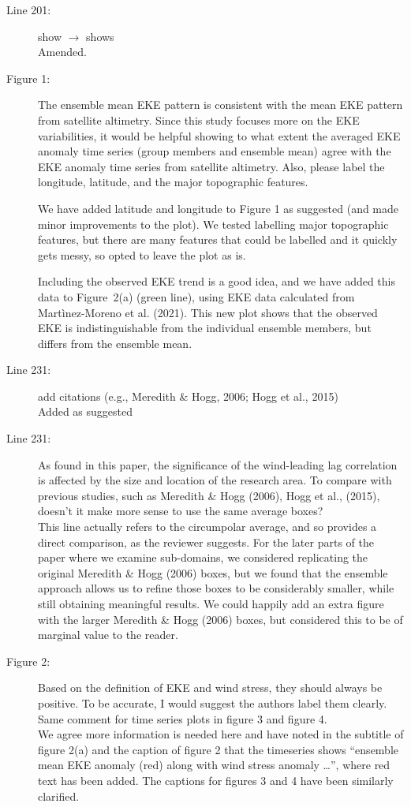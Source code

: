 \documentclass[11pt]{article}
\begin{document}
{\begin{description}
\item[Line 201:] show $\to$ shows\\
{\color{black} Amended. }

\item[Figure 1:] The ensemble mean EKE pattern is consistent with the mean EKE pattern from satellite altimetry. Since this study focuses more on the EKE variabilities, it would be helpful showing to what extent the averaged EKE anomaly time series (group members and ensemble mean) agree with the EKE anomaly time series from satellite altimetry. Also, please label the longitude, latitude, and the major topographic features. \\
{\color{black}  We have added latitude and longitude to Figure 1 as suggested (and made minor improvements to the plot).
We tested labelling major topographic features, but there are many features that could be labelled and it quickly gets messy, so opted to leave the plot as is.

Including the observed EKE trend is a good idea, and we have added this data to Figure~2(a) (green line), using EKE data calculated from Mart\`inez-Moreno et al. (2021).
This new plot shows that the observed EKE is indistinguishable from the individual ensemble members, but differs from the ensemble mean.}

\item[Line 231:] add citations (e.g., Meredith \& Hogg, 2006; Hogg et al., 2015) \\
{\color{black} Added as suggested }

\item[Line 231:] As found in this paper, the significance of the wind-leading lag correlation is affected by the size and location of the research area. To compare with previous studies, such as Meredith \& Hogg (2006), Hogg et al., (2015), doesn't it make more sense to use the same average boxes? \\
{\color{black} This line actually refers to the circumpolar average, and so provides a direct comparison, as the reviewer suggests.  
For the later parts of the paper where we examine sub-domains, we considered replicating the original Meredith \& Hogg (2006) boxes, but we found that the ensemble approach allows us to refine those boxes to be considerably smaller, while still obtaining meaningful results.
We could happily add an extra figure with the larger Meredith \& Hogg (2006) boxes, but considered this to be of marginal value to the reader.}

\item[Figure 2:] Based on the definition of EKE and wind stress, they should always be positive. To be accurate, I would suggest the authors label them clearly. Same comment for time series plots in figure 3 and figure 4. \\
{\color{black} We agree more information is needed here and have noted in the subtitle of figure 2(a) and the caption of figure 2 that the timeseries shows ``ensemble mean {\color{red}EKE anomaly} (red) along with wind stress {\color{red}anomaly} \ldots'', where red text has been added. 
The captions for figures 3 and 4 have been similarly clarified.}


\end{description}}
\end{document}

